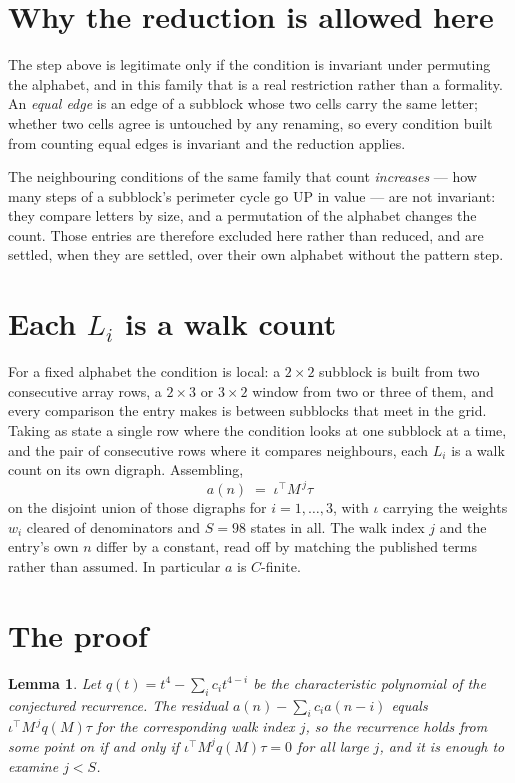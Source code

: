\documentclass[11pt,a4paper]{article}
\theoremstyle{plain}
\newtheorem{lemma}[theorem]{Lemma}
\theoremstyle{definition}
\begin{document}
\section{Why the reduction is allowed here}

The step above is legitimate only if the condition is invariant under permuting the alphabet,
and in this family that is a real restriction rather than a formality. An \emph{equal edge}
is an edge of a subblock whose two cells carry the same letter; whether two cells agree is
untouched by any renaming, so every condition built from counting equal edges is invariant and
the reduction applies.

The neighbouring conditions of the same family that count \emph{increases} --- how many steps
of a subblock's perimeter cycle go UP in value --- are not invariant: they compare letters by
size, and a permutation of the alphabet changes the count. Those entries are therefore excluded
here rather than reduced, and are settled, when they are settled, over their own alphabet
without the pattern step.

\section{Each $L_i$ is a walk count}

For a fixed alphabet the condition is local: a $2\times2$ subblock is built from two
consecutive array rows, a $2\times3$ or $3\times2$ window from two or three of them, and every
comparison the entry makes is between subblocks that meet in the grid. Taking as state a single
row where the condition looks at one subblock at a time, and the pair of consecutive rows where
it compares neighbours, each $L_i$ is a walk count on its own digraph. Assembling,
\[
a(n)\;=\;\iota^{\!\top}M^{\,j}\tau
\]
on the disjoint union of those digraphs for $i=1,\dots,3$, with $\iota$ carrying the weights
$w_i$ cleared of denominators and $S=98$ states in all. The walk index $j$ and the entry's own
$n$ differ by a constant, read off by matching the published terms rather than assumed. In
particular $a$ is $C$-finite.

\section{The proof}

\begin{lemma}\label{lem:crit}
Let $q(t)=t^{4}-\sum_i c_it^{4-i}$ be the characteristic polynomial of the
conjectured recurrence. The residual $a(n)-\sum_ic_ia(n-i)$ equals
$\iota^{\!\top}M^{\,j}q(M)\tau$ for the corresponding walk index $j$, so the recurrence
holds from some point on if and only if $\iota^{\!\top}M^{j}q(M)\tau=0$ for all large $j$,
and it is enough to examine $j<S$.
\end{lemma}
\end{document}
